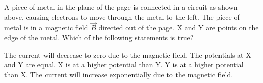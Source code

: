 \documentclass[12pt]{../../oss-apphys-exam}
\begin{document}
\begin{questions}
  \question A piece of metal in the plane of the page is connected in a circuit
  as shown above, causing electrons to move through the metal to the left. The
  piece of metal is in a magnetic field $\vec B$ directed out of the page. X
  and Y are points on the edge of the metal. Which of the following statements
  is true?
  \begin{choices}
    \choice The current will decrease to zero due to the magnetic field.
    \choice The potentials at X and Y are equal.
    \choice X is at a higher potential than Y.
    \choice Y is at a higher potential than X.
    \choice The current will increase exponentially due to the magnetic field.
  \end{choices}
  
 
  
\end{questions}
\end{document}
